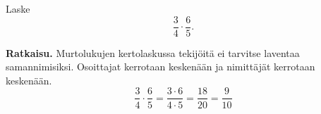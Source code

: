 \begin{esimerkki}
	Laske
	\[
        \frac{3}{4}\cdot \frac{6}{5}.
        \]
	
        \textbf{Ratkaisu.}
        Murtolukujen kertolaskussa tekijöitä ei tarvitse laventaa samannimisiksi. Osoittajat kerrotaan keskenään ja nimittäjät kerrotaan keskenään. 
      \[
        \frac{3}{4}\cdot \frac{6}{5}= \frac{3\cdot 6}{4\cdot 5}= \frac{18}{20}=\frac{9}{10}
        \]
    \end{esimerkki}
    

